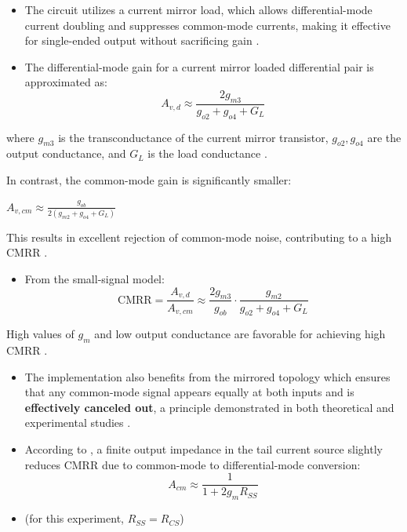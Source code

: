 \begin{itemize} 
    \item The circuit utilizes a current mirror load, which allows differential-mode current doubling and suppresses common-mode currents, making it effective for single-ended output without sacrificing gain \cite{fonstad_mit2009}.
    \item The differential-mode gain for a current mirror loaded differential pair is approximated as:
    \[
    A_{v,d} \approx \frac{2g_{m3}}{g_{o2} + g_{o4} + G_L}
    \]
\end{itemize}
\newpage
\par
where \(g_{m3}\) is the transconductance of the current mirror transistor, \(g_{o2}, g_{o4}\) are the output conductance, and \(G_L\) is the load conductance \cite{fonstad_mit2009}.
\par
\begin{itemize}
    \item In contrast, the common-mode gain is significantly smaller:
    \begin{center}
    \item $A_{v,cm} \approx \frac{g_{ob}}{2(g_{m2} + g_{o4} + G_L)}$    
    \end{center}
\end{itemize}
This results in excellent rejection of common-mode noise, contributing to a high CMRR \cite{fonstad_mit2009}.
\begin{itemize}
        
    \item From the small-signal model:
    \[
    \text{CMRR} = \frac{A_{v,d}}{A_{v,cm}} \approx \frac{2g_{m3}}{g_{ob}} \cdot \frac{g_{m2}}{g_{o2} + g_{o4} + G_L}
    \]
\end{itemize}
High values of \(g_m\) and low output conductance are favorable for achieving high CMRR \cite{fonstad_mit2009}.
\begin{itemize}
    
    \item The implementation also benefits from the mirrored topology which ensures that any common-mode signal appears equally at both inputs and is \textbf{effectively canceled out}, a principle demonstrated in both theoretical and experimental studies \cite{razaviDifferentialPair}.
    
    \item According to \cite{palermoLab6}, a finite output impedance in the tail current source slightly reduces CMRR due to common-mode to differential-mode conversion:
    \[
    A_{cm} \approx \frac{1}{1 + 2g_mR_{SS}}
    \]
    \item (for this experiment, $R_{SS} = R_{CS}$)
\end{itemize}
